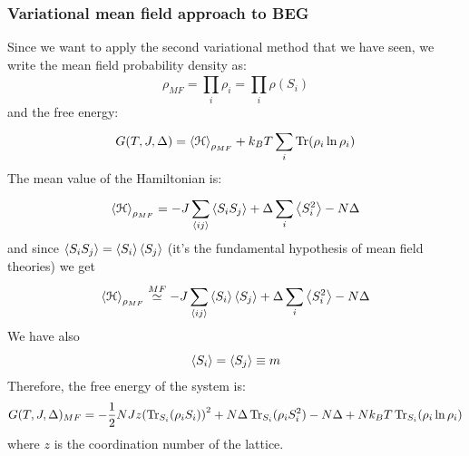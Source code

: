 \documentclass[../main/main.tex]{subfiles}
\begin{document}
\subsubsection{Variational mean field approach to BEG}
Since we want to apply the second variational method that we have seen, we write the mean field probability density as:
\begin{equation*}
  \rho _{MF} = \prod_{i}^{} \rho _i   =  \prod_{i}^{} \rho (S_i)
\end{equation*}
and the free energy:
\begin{equation}
  G(T,J,\Delta ) = \expval{\mathcal{H}}_{\rho _{MF}} + k_B T \sum_{i}^{} \Tr(\rho _i \ln{\rho _i } )
\end{equation}
The mean value of the Hamiltonian is:
\begin{equation*}
\expval{\mathcal{H}}_{\rho _{MF}}   = - J \sum_{\expval{ij} }^{} \expval{S_i S_j}  + \Delta \sum_{i}^{} \expval{S_i^2} - N \Delta  
\end{equation*}
and since \(\expval{S_i S_j} = \expval{S_i} \expval{S_j} \) (it's the fundamental hypothesis of mean field theories) we get
\begin{equation*}
\expval{\mathcal{H}}_{\rho _{MF}} \overset{MF}{\simeq } - J \sum_{\expval{ij} }^{} \expval{S_i} \expval{S_j} + \Delta \sum_{i}^{} \expval{S_i^2} - N \Delta   
\end{equation*}
We have also
\begin{equation*}
  \expval{S_i} = \expval{S_j} \equiv m
\end{equation*}
Therefore, the free energy of the system is:
\begin{equation}
  G(T,J, \Delta )_{MF}  = - \frac{1}{2} N J z \qty( \Tr_{S_i}(\rho _i S_i) )^2
  + N \Delta \Tr_{S_i}(\rho _i S_i^2) - N \Delta +
  N k_B T \Tr_{S_i}(\rho _i \ln{\rho _i} )
\end{equation}
where \(z\) is the coordination number of the lattice.
\end{document}
